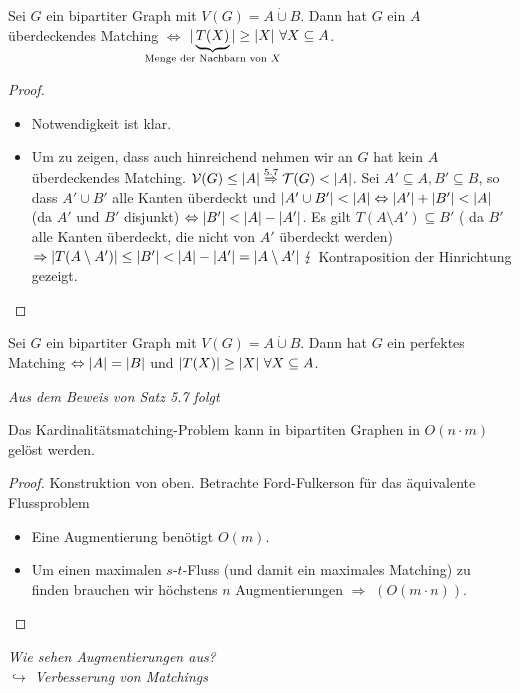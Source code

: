 \begin{satz}
	Sei $G$ ein bipartiter Graph mit $V(G)=A\dot\cup B$. Dann hat $G$ ein $A$ überdeckendes Matching $\Leftrightarrow$ $\card{\underbrace{T(X)}_{\mathclap{\text{Menge der Nachbarn von } X}}} \ge \card{X}~\forall X\subseteq A$.
\end{satz}
\begin{proof}~
	\begin{itemize}
		\item Notwendigkeit ist klar.
		\item Um zu zeigen, dass auch hinreichend nehmen wir an $G$ hat kein $A$ überdeckendes Matching. $\mathcal{V}(G) \le \vert A \vert \overset{5.7}{\Rightarrow} \mathcal{T}(G) < \vert A \vert$. Sei $A' \subseteq A, B' \subseteq B$, so dass $A' \cup B'$ alle Kanten überdeckt und $\vert A' \cup B' \vert < \vert A \vert \Leftrightarrow \vert A' \vert + \vert B' \vert < \vert A \vert$ (da $A'$ und $B'$ disjunkt) $\Leftrightarrow \vert B' \vert < \vert A \vert - \vert A' \vert$. Es gilt $T(A\setminus A') \subseteq B'$ ( da $B'$ alle Kanten überdeckt, die nicht von $A'$ überdeckt werden) $\Rightarrow \vert T(A\setminus A') \vert \le \vert B' \vert < \vert A \vert - \vert A' \vert = \vert A\setminus A' \vert~\lightning$ Kontraposition der Hinrichtung gezeigt.
	\end{itemize}
\end{proof}
\begin{korollar}
	Sei $G$ ein bipartiter Graph mit $V(G) = A\dot\cup B$. Dann hat $G$ ein perfektes Matching $\Leftrightarrow \vert A \vert=\vert B \vert$ und $\vert T(X) \vert \ge \vert X \vert~\forall X \subseteq A$.
\end{korollar}
\textit{Aus dem Beweis von Satz 5.7 folgt}
\begin{korollar}
	Das Kardinalitätsmatching-Problem kann in bipartiten Graphen in $O(n\cdot m)$ gelöst werden.
\end{korollar}
\begin{proof}
	Konstruktion von oben. Betrachte Ford-Fulkerson für das äquivalente Flussproblem
	\begin{itemize}
		\item Eine Augmentierung benötigt $O(m)$.
		\item Um einen maximalen $s$-$t$-Fluss (und damit ein maximales Matching) zu finden brauchen wir höchstens $n$ Augmentierungen $\Rightarrow$ $(O(m\cdot n))$.
	\end{itemize}
\end{proof}
\textit{Wie sehen Augmentierungen aus?\\
\hspace*{10pt}$\hookrightarrow$ Verbesserung von Matchings}
